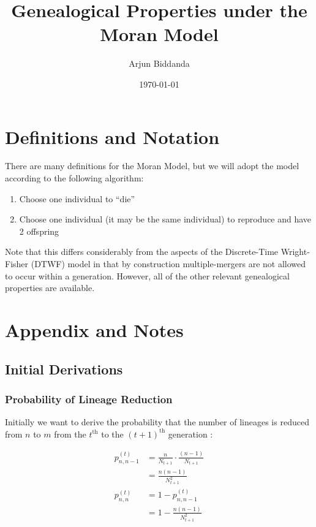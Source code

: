\documentclass[10pt]{article}
\title{Genealogical Properties under the Moran Model}\author{Arjun Biddanda}
\date{\today}
\begin{document}
\maketitle

\section{Definitions and Notation}

There are many definitions for the Moran Model, but we will adopt the model according to the following algorithm:

\begin{enumerate}
	\item Choose one individual to ``die''
	\item Choose one individual (it may be the same individual) to reproduce and have 2 offspring
\end{enumerate}

Note that this differs considerably from the aspects of the Discrete-Time Wright-Fisher (DTWF) model in that by construction multiple-mergers are not allowed to occur within a generation. However, all of the other relevant genealogical properties are available.

\section{Appendix and Notes}

\subsection{Initial Derivations}

\subsubsection{Probability of Lineage Reduction}
Initially we want to derive the probability that the number of lineages is reduced from $n$ to $m$ from the $t^{\text{th}}$ to the $(t+1)^{\text{th}}$ generation :

$$
\begin{aligned}
	p^{(t)}_{n,n-1} &= \frac{n}{N_{t+1}}\cdot \frac{(n-1)}{N_{t+1}}\\
	&= \frac{n(n-1)}{N^2_{t+1}}\\
	p^{(t)}_{n,n} &= 1 - p^{(t)}_{n,n-1}\\
	&= 1 - \frac{n(n-1)}{N^2_{t+1}}\\
\end{aligned}
$$
\end{document}
